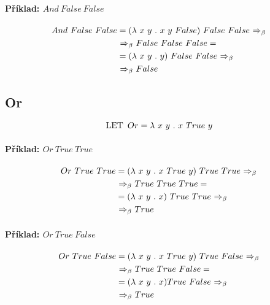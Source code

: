 \paragraph*{Příklad: $And ~ False ~ False$}
\begin{equation}
    \begin{split}
        And ~ False ~ False &= (\lk x ~ y \lkdot x ~ y ~ False) ~ False ~ False \lkbeta \\
        &\lkbeta False ~ False ~ False = \\
        &= (\lk x ~ y \lkdot y) ~ False ~ False \lkbeta \\
        &\lkbeta False
    \end{split}
\end{equation}

\subsection{Or}

$$ \lklet Or = \lk x ~ y \lkdot x ~ True ~ y $$

\paragraph*{Příklad: $Or ~ True ~ True$}
\begin{equation}
    \begin{split}
        Or ~ True ~ True &= (\lk x ~ y \lkdot x ~ True ~ y) ~ True ~ True \lkbeta \\
        &\lkbeta True ~ True ~ True = \\
        &= (\lk x ~ y \lkdot x) ~ True ~ True \lkbeta \\
        &\lkbeta True
    \end{split}
\end{equation}

\paragraph*{Příklad: $Or ~ True ~ False$}
\begin{equation}
    \begin{split}
        Or ~ True ~ False &= (\lk x ~ y \lkdot x ~ True ~ y) ~ True ~ False \lkbeta \\
        &\lkbeta True ~ True ~ False = \\
        &= (\lk x ~ y \lkdot x) True ~ False \lkbeta \\
        &\lkbeta True
    \end{split}
\end{equation}

